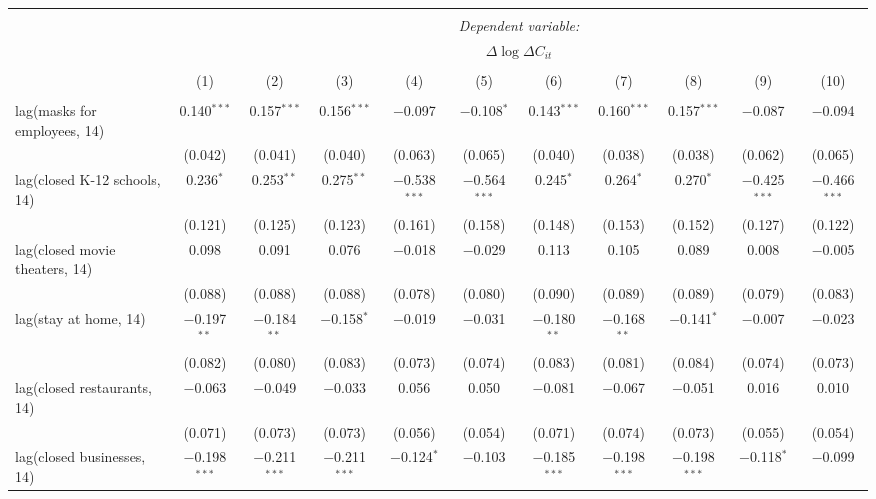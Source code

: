 \begin{tabular}{@{\extracolsep{1pt}}lcccccccccc} 
\\[-1.8ex]\hline 
\hline \\[-1.8ex] 
 & \multicolumn{10}{c}{\textit{Dependent variable:}} \\ 
\cline{2-11} 
 & \multicolumn{10}{c}{$\Delta \log \Delta C_{it}$} \\ 
\\[-1.8ex] & (1) & (2) & (3) & (4) & (5) & (6) & (7) & (8) & (9) & (10)\\ 
\hline \\[-1.8ex] 
 lag(masks for employees, 14) & 0.140$^{***}$ & 0.157$^{***}$ & 0.156$^{***}$ & $-$0.097 & $-$0.108$^{*}$ & 0.143$^{***}$ & 0.160$^{***}$ & 0.157$^{***}$ & $-$0.087 & $-$0.094 \\ 
  & (0.042) & (0.041) & (0.040) & (0.063) & (0.065) & (0.040) & (0.038) & (0.038) & (0.062) & (0.065) \\ 
  lag(closed K-12 schools, 14) & 0.236$^{*}$ & 0.253$^{**}$ & 0.275$^{**}$ & $-$0.538$^{***}$ & $-$0.564$^{***}$ & 0.245$^{*}$ & 0.264$^{*}$ & 0.270$^{*}$ & $-$0.425$^{***}$ & $-$0.466$^{***}$ \\ 
  & (0.121) & (0.125) & (0.123) & (0.161) & (0.158) & (0.148) & (0.153) & (0.152) & (0.127) & (0.122) \\ 
  lag(closed movie theaters, 14) & 0.098 & 0.091 & 0.076 & $-$0.018 & $-$0.029 & 0.113 & 0.105 & 0.089 & 0.008 & $-$0.005 \\ 
  & (0.088) & (0.088) & (0.088) & (0.078) & (0.080) & (0.090) & (0.089) & (0.089) & (0.079) & (0.083) \\ 
  lag(stay at home, 14) & $-$0.197$^{**}$ & $-$0.184$^{**}$ & $-$0.158$^{*}$ & $-$0.019 & $-$0.031 & $-$0.180$^{**}$ & $-$0.168$^{**}$ & $-$0.141$^{*}$ & $-$0.007 & $-$0.023 \\ 
  & (0.082) & (0.080) & (0.083) & (0.073) & (0.074) & (0.083) & (0.081) & (0.084) & (0.074) & (0.073) \\ 
  lag(closed restaurants, 14) & $-$0.063 & $-$0.049 & $-$0.033 & 0.056 & 0.050 & $-$0.081 & $-$0.067 & $-$0.051 & 0.016 & 0.010 \\ 
  & (0.071) & (0.073) & (0.073) & (0.056) & (0.054) & (0.071) & (0.074) & (0.073) & (0.055) & (0.054) \\ 
  lag(closed businesses, 14) & $-$0.198$^{***}$ & $-$0.211$^{***}$ & $-$0.211$^{***}$ & $-$0.124$^{*}$ & $-$0.103 & $-$0.185$^{***}$ & $-$0.198$^{***}$ & $-$0.198$^{***}$ & $-$0.118$^{*}$ & $-$0.099 \\ 

\end{tabular}
